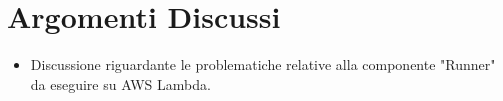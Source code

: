 \section{Argomenti Discussi}
	\begin{itemize}
		\item Discussione riguardante le problematiche relative alla componente "Runner" da eseguire su AWS Lambda.
	\end{itemize}
